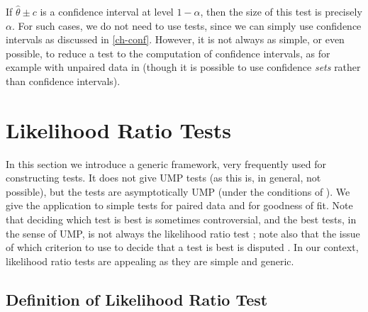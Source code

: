  If $\hat{\theta} \pm c$ is a confidence
 interval at level  $1-\alpha$, then the size of this test is precisely $\alpha$.
For such cases, we do not need to use tests, since we can
simply use confidence intervals as discussed in \cref{ch-conf}.
However, it is not always as simple, or even possible, to
reduce a test to the computation of confidence intervals, as
for example with unpaired data in  (though it
is possible to use confidence \emph{sets} rather than
confidence intervals).
%
%


%
%
%
%



\section{Likelihood Ratio Tests}
 In this section we
introduce a generic framework, very frequently used for
constructing tests. It does not give UMP tests (as this is, in
general, not possible), but the tests are asymptotically UMP
(under the conditions of ). We give the
application to simple tests for paired data and for goodness of
fit. Note that deciding which test is best is sometimes
controversial, and the best tests, in the sense of UMP, is not
always the likelihood ratio test \cite{lehmann2006lrt}; note
also that the issue of which criterion to use to decide that a
test is best is disputed \cite{perlman1999esn}. In our context,
likelihood ratio tests are appealing as they are simple and
generic.


\subsection{Definition of Likelihood Ratio Test}
